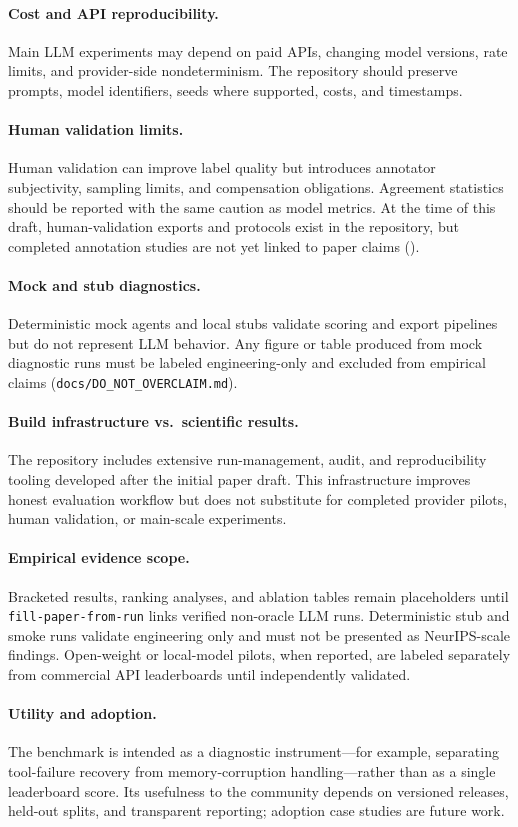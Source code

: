 \paragraph{Cost and API reproducibility.}
Main LLM experiments may depend on paid APIs, changing model versions, rate limits, and provider-side nondeterminism. The repository should preserve prompts, model identifiers, seeds where supported, costs, and timestamps.

\paragraph{Human validation limits.}
Human validation can improve label quality but introduces annotator subjectivity, sampling limits, and compensation obligations. Agreement statistics should be reported with the same caution as model metrics. At the time of this draft, human-validation exports and protocols exist in the repository, but completed annotation studies are not yet linked to paper claims ().

\paragraph{Mock and stub diagnostics.}
Deterministic mock agents and local stubs validate scoring and export pipelines but do not represent LLM behavior. Any figure or table produced from mock diagnostic runs must be labeled engineering-only and excluded from empirical claims (\texttt{docs/DO\_NOT\_OVERCLAIM.md}).

\paragraph{Build infrastructure vs.\ scientific results.}
The repository includes extensive run-management, audit, and reproducibility tooling developed after the initial paper draft. This infrastructure improves honest evaluation workflow but does not substitute for completed provider pilots, human validation, or main-scale experiments.

\paragraph{Empirical evidence scope.}
Bracketed results, ranking analyses, and ablation tables remain placeholders until \texttt{fill-paper-from-run} links verified non-oracle LLM runs. Deterministic stub and smoke runs validate engineering only and must not be presented as NeurIPS-scale findings. Open-weight or local-model pilots, when reported, are labeled separately from commercial API leaderboards until independently validated.

\paragraph{Utility and adoption.}
The benchmark is intended as a diagnostic instrument---for example, separating tool-failure recovery from memory-corruption handling---rather than as a single leaderboard score. Its usefulness to the community depends on versioned releases, held-out splits, and transparent reporting; adoption case studies are future work.
